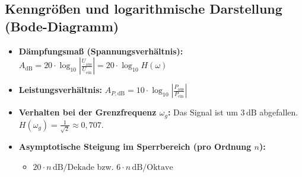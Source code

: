\documentclass[a4paper,11pt]{article}
\begin{document}
\subsection*{Kenngrößen und logarithmische Darstellung (Bode-Diagramm)}
\begin{itemize}
    \item \textbf{Dämpfungsmaß (Spannungsverhältnis):} $A_{\mathrm{dB}} = 20 \cdot \log_{10}\left|\frac{\underline{U}_{\text{aus}}}{\underline{U}_{\text{ein}}}\right| = 20 \cdot \log_{10} H(\omega)$
    \item \textbf{Leistungsverhältnis:} $A_{P,\mathrm{dB}} = 10 \cdot \log_{10}\left|\frac{P_{\text{aus}}}{P_{\text{ein}}}\right|$
    \item \textbf{Verhalten bei der Grenzfrequenz $\omega_g$:} Das Signal ist um $3\,\mathrm{dB}$ abgefallen. $H(\omega_g) = \frac{1}{\sqrt{2}} \approx 0,707$.
    \item \textbf{Asymptotische Steigung im Sperrbereich (pro Ordnung $n$):} 
    \begin{itemize}
        \item $20 \cdot n\,\mathrm{dB/Dekade}$ \quad bzw. \quad $6 \cdot n\,\mathrm{dB/Oktave}$
    \end{itemize}
\end{itemize}
\end{document}
